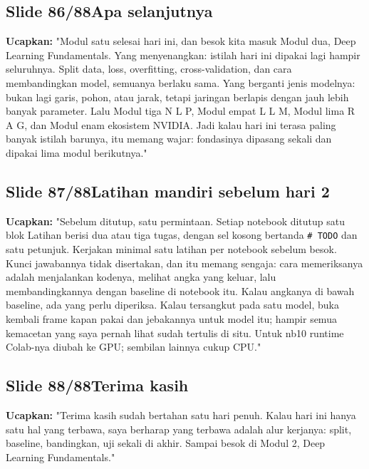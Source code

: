 \documentclass[11pt]{article}
\renewcommand{\framebox}[1]{\colorbox{acc!15}{\textcolor{acc}{\textbf{#1}}}}
\begin{document}
\subsection*{\framebox{Slide 86/88}\quad Apa selanjutnya}
\textbf{Ucapkan:} "Modul satu selesai hari ini, dan besok kita masuk Modul dua, Deep Learning Fundamentals. Yang menyenangkan: istilah hari ini dipakai lagi hampir seluruhnya. Split data, loss, overfitting, cross-validation, dan cara membandingkan model, semuanya berlaku sama. Yang berganti jenis modelnya: bukan lagi garis, pohon, atau jarak, tetapi jaringan berlapis dengan jauh lebih banyak parameter. Lalu Modul tiga N L P, Modul empat L L M, Modul lima R A G, dan Modul enam ekosistem NVIDIA. Jadi kalau hari ini terasa paling banyak istilah barunya, itu memang wajar: fondasinya dipasang sekali dan dipakai lima modul berikutnya."\\[2pt]

\subsection*{\framebox{Slide 87/88}\quad Latihan mandiri sebelum hari 2}
\textbf{Ucapkan:} "Sebelum ditutup, satu permintaan. Setiap notebook ditutup satu blok Latihan berisi dua atau tiga tugas, dengan sel kosong bertanda \texttt{\# TODO} dan satu petunjuk. Kerjakan minimal satu latihan per notebook sebelum besok. Kunci jawabannya tidak disertakan, dan itu memang sengaja: cara memeriksanya adalah menjalankan kodenya, melihat angka yang keluar, lalu membandingkannya dengan baseline di notebook itu. Kalau angkanya di bawah baseline, ada yang perlu diperiksa. Kalau tersangkut pada satu model, buka kembali frame kapan pakai dan jebakannya untuk model itu; hampir semua kemacetan yang saya pernah lihat sudah tertulis di situ. Untuk nb10 runtime Colab-nya diubah ke GPU; sembilan lainnya cukup CPU."\\[2pt]

\subsection*{\framebox{Slide 88/88}\quad Terima kasih}
\textbf{Ucapkan:} "Terima kasih sudah bertahan satu hari penuh. Kalau hari ini hanya satu hal yang terbawa, saya berharap yang terbawa adalah alur kerjanya: split, baseline, bandingkan, uji sekali di akhir. Sampai besok di Modul 2, Deep Learning Fundamentals."\\[2pt]
\end{document}
